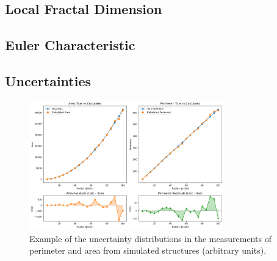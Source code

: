 \subsection{Local Fractal Dimension}

\subsection{Euler Characteristic}

\subsection{Uncertainties}

\begin{figure}[h]
    \centering
    \includegraphics[width=0.75\textwidth]{figures/perimeter_area_uncertainties.png}
    \caption{Example of the uncertainty distributions in the measurements of perimeter and area from simulated structures (arbitrary units).}
    \label{fig:uncertainties}
\end{figure}

